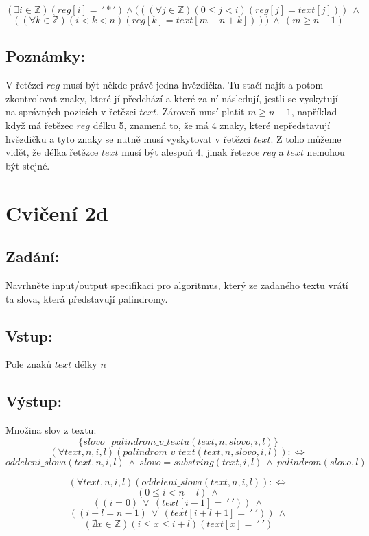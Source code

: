 \documentclass{article}
\newcommand{\Z}{\mathbb{Z}}
\begin{document}
$$(\exists i \in \Z)(reg[i] =\ '*') \wedge (((\forall j \in \Z)(0 \leq j < i)(reg[j] = text[j])) \ \wedge $$
$$((\forall k \in \Z)(i < k < n)(reg[k] = text[m-n+k]))) \ \wedge \ (m \geq n - 1)$$

\subsection{Poznámky:}

V řetězci $reg$ musí být někde právě jedna hvězdička. Tu stačí najít a potom zkontrolovat znaky, které jí předchází a které za ní následují, jestli se vyskytují na správných pozicích v řetězci $text$. Zároveň musí platit $m \geq n - 1$, například když má řetězec $reg$ délku 5, znamená to, že má 4 znaky, které nepředstavují hvězdičku a tyto znaky se nutně musí vyskytovat v řetězci $text$. Z toho můžeme vidět, že délka řetězce $text$ musí být alespoň 4, jinak řetezce $req$ a $text$ nemohou být stejné.

\section{Cvičení 2d}

\subsection{Zadání:}

Navrhněte input/output specifikaci pro algoritmus, který ze zadaného textu vrátí ta slova, která představují palindromy.

\subsection{Vstup:}

Pole znaků $text$ délky $n$

\subsection{Výstup:}

Množina slov z textu: 
$$\{slovo\ |\ palindrom\_v\_textu(text,n,slovo,i,l)\}$$ \newline
$$(\forall text,n,i,l)(palindrom\_v\_text(text,n,slovo,i,l)):\Leftrightarrow $$
$$ oddeleni\_slova(text,n,i,l)\ \wedge \ slovo=substring(text,i,l)\ \wedge \ palindrom(slovo,l)$$ \newline

$$(\forall text,n,i,l)(oddeleni\_slova(text,n,i,l)): \Leftrightarrow $$
$$ (0 \leq i < n - l) \ \wedge $$
$$ ((i=0) \ \lor \  (text[i-1]=\ '\ '))\ \wedge $$
$$ ((i+l=n-1) \ \lor \ (text[i+l+1]=\ '\ ')) \ \wedge $$
$$ (\nexists x \in \Z)(i \leq x \leq i+l)(text[x]=\ '\ ')$$ \newline
\end{document}
